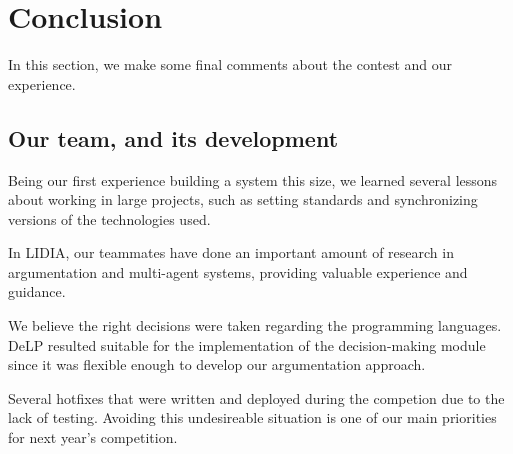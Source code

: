 \documentclass{llncs2e/llncs}
\begin{document}
    

\section{Conclusion}


    In this section, we make some final comments about the contest and our experience.

\subsection{Our team, and its development}

    Being our first experience building a system this size, we learned several
    lessons about working in large projects, such as setting standards and
    synchronizing versions of the technologies used.

    In LIDIA, our teammates have done an important amount of research in
    argumentation and multi-agent systems, providing valuable experience and
    guidance. 

    We believe the right decisions were taken regarding the
    programming languages.  DeLP resulted suitable for the implementation
    of the decision-making module since it was flexible enough to develop our
    argumentation approach.

    Several hotfixes that were written and deployed during the competion due to
    the lack of testing. Avoiding this undesireable situation is one of our main
    priorities for next year's competition.
\end{document}
